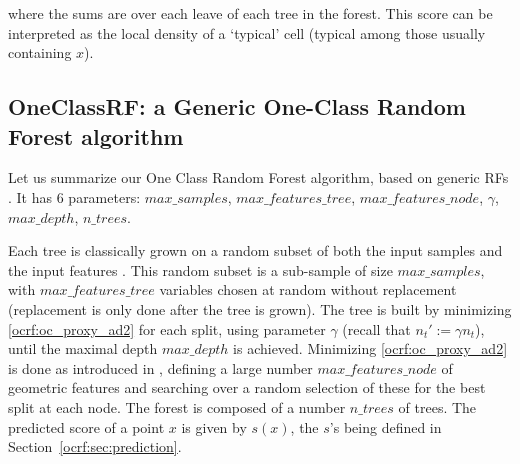 \begin{remark}
where the sums are over each leave of each tree in the forest.
This score can be interpreted as the local density of a `typical' cell (typical among those usually containing $x$).
%
\end{remark}



\subsection{OneClassRF: a Generic One-Class Random Forest algorithm}
Let us summarize our One Class Random Forest algorithm, based on generic RFs \citep{Breiman2001}. It has $6$ parameters:
$max\_samples$, $max\_features\_tree$, $max\_features\_node$, $\gamma$, $max\_depth$, $n\_trees$.

Each tree is classically grown on a random subset of both the input samples and the input features \citep{Ho1998, Panov2007}.
This random subset is a sub-sample of size $max\_samples$, with $max\_features\_tree$ variables chosen at random without replacement (replacement is only done after the tree is grown). The tree is built by minimizing \eqref{ocrf:oc_proxy_ad2} for each split, using parameter $\gamma$ (recall that $n_t' := \gamma n_t$), until the maximal depth $max\_depth$ is achieved.
Minimizing \eqref{ocrf:oc_proxy_ad2} is done as introduced in \cite{Amit1997}, defining a large number $max\_features\_node$ of geometric features and searching over a random selection of these for the best split at each node.
%
The forest is composed of a number $n\_trees$ of trees. The predicted score of a point $x$ is given by $s(x)$, the $s$'s being defined in Section~\ref{ocrf:sec:prediction}.



